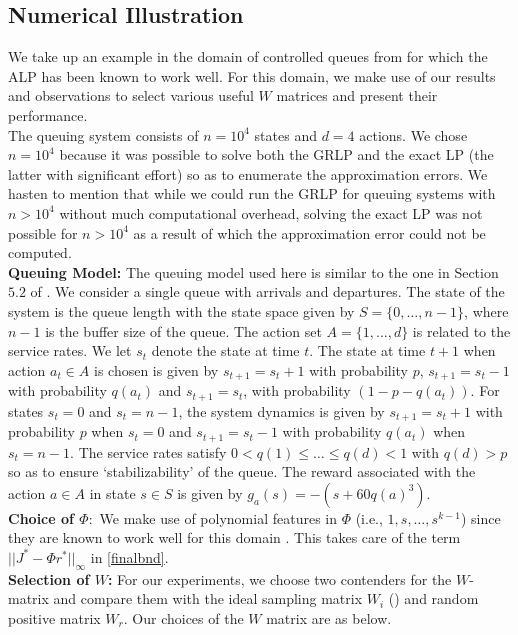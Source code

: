 \documentclass[12pt,draftcls,onecolumn]{IEEEtran}
\begin{document}
\subsection{Numerical Illustration}
We take up an example in the domain of controlled queues from \cite{ALP} for which the ALP has been known to work well. For this domain, we make use of our results and observations to select various useful $W$ matrices and present their performance.\\
The queuing system consists of $n=10^4$ states and $d=4$ actions. We chose $n=10^4$ because it was possible to solve both the GRLP and the exact LP (the latter with significant effort) so as to enumerate the approximation errors. We hasten to mention that while we could run the GRLP for queuing systems with $n>10^4$ without much computational overhead, solving the exact LP was not possible for $n>10^4$ as a result of which the approximation error could not be computed.\\
\textbf{Queuing Model:}
The queuing model used here is similar to the one in Section~$5.2$ of \cite{ALP}. We consider a single queue with arrivals and departures. The state of the system is the queue length with the state space given by $S=\{0,\ldots,n-1\}$, where $n-1$ is the buffer size of the queue. The action set $A=\{1,\ldots,d\}$ is related to the service rates. We let $s_t$ denote the state at time $t$. The state at time $t+1$ when action $a_t \in A $ is chosen is given by $s_{t+1}= s_{t}+1$ with probability $p$, $s_{t+1}= s_{t}-1$ with probability $q(a_t)$ and $s_{t+1}= s_t$, with probability $(1-p-q(a_t))$. For states $s_t=0$ and $s_t=n-1$, the system dynamics is given by 	$s_{t+1}= s_{t}+1$ with probability $p$ when $s_t=0$ and $s_{t+1}=s_t-1$ with probability $q(a_t)$ when $s_t=n-1$.
The service rates satisfy $0<q(1)\leq \ldots\leq q(d)<1$ with $q(d)>p$ so as to ensure `stabilizability' of the queue. The reward associated with the action $a \in A$ in state $s\in S$ is given by $g_a(s)=-(s+60q(a)^3)$.\\
\textbf{Choice of $\Phi:$} We make use of polynomial features in $\Phi$ (i.e., $1,s,\ldots,s^{k-1}$) since they are known to work well for this domain \cite{ALP}. This takes care of the term $||J^*-\Phi r^*||_\infty$ in \eqref{finalbnd}. \\
\textbf{Selection of $W$:} For our experiments, we choose two contenders for the $W$-matrix and compare them with the ideal sampling matrix $W_i$ (\cite{CS}) and random positive matrix $W_r$. Our choices of the $W$ matrix are as below.\\
\end{document}
